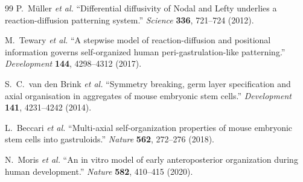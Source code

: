 \documentclass[11pt]{article}
\begin{document}
\begin{thebibliography}{99}
P.~M\"uller \textit{et al.} ``Differential diffusivity of Nodal and Lefty
underlies a reaction-diffusion patterning system.''
\textit{Science} \textbf{336}, 721--724 (2012).

M.~Tewary \textit{et al.} ``A stepwise model of reaction-diffusion and
positional information governs self-organized human peri-gastrulation-like
patterning.'' \textit{Development} \textbf{144}, 4298--4312 (2017).

S.~C.~van den Brink \textit{et al.} ``Symmetry breaking, germ layer
specification and axial organisation in aggregates of mouse embryonic stem
cells.'' \textit{Development} \textbf{141}, 4231--4242 (2014).

L.~Beccari \textit{et al.} ``Multi-axial self-organization properties of
mouse embryonic stem cells into gastruloids.''
\textit{Nature} \textbf{562}, 272--276 (2018).

N.~Moris \textit{et al.} ``An in vitro model of early anteroposterior
organization during human development.''
\textit{Nature} \textbf{582}, 410--415 (2020).

\end{thebibliography}
\end{document}
